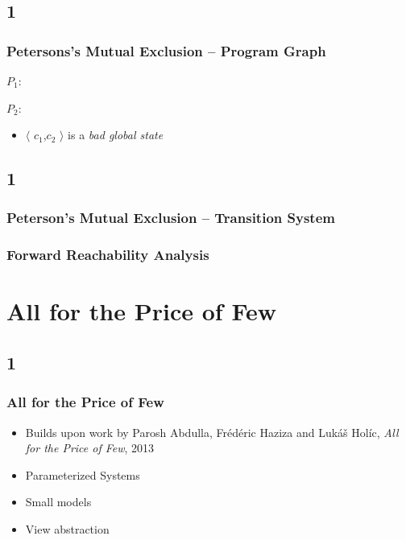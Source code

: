 \documentclass[handout]{beamer}
\begin{document}
\subsection*{1}
\begin{frame}
  \begin{example}
    \frametitle{Petersons's Mutual Exclusion -- Program Graph}
    $P_1$:

     \petersonone

    $P_2$:

     \petersontwo
  \end{example}
  \begin{itemize}
  \item
    $\langle$ $c_1$,$c_2$ $\rangle$ is a \emph{bad global state}
  \end{itemize}

\end{frame}

\subsection*{1}
\begin{frame}
  \frametitle{Peterson's Mutual Exclusion -- Transition System}
  \begin{example}
    \center
    \petersonboth
  \end{example}
\end{frame}

\begin{frame}
    \begin{example}
    \center
    \frametitle{Forward Reachability Analysis}
    \freachability
    \end{example}
\end{frame}

\section{All for the Price of Few}
\subsection*{1}
\begin{frame}
  \frametitle{All for the Price of Few}
  \begin{itemize}
  \item Builds upon work by Parosh Abdulla, Fr\'ed\'eric Haziza and Luk\'a\v{s} Hol\'ic, \emph{All for the Price of Few}, 2013
  \item Parameterized Systems
  \item Small models
  \item View abstraction
  \end{itemize}
\end{frame}
\end{document}
